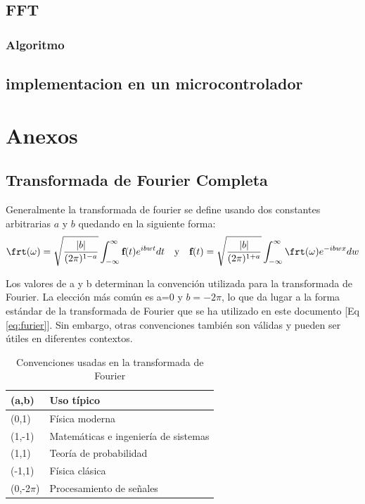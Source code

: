 \documentclass[12pt]{article}
\begin{document}
\subsection{FFT}
\subsubsection{Algoritmo}
\subsection{implementacion en un microcontrolador}
\newpage
\section{Anexos}
\appendix
\renewcommand{\thesubsection}{\Roman{subsection}}

\subsection{Transformada de Fourier Completa \label{sec:Fcompleta}}
Generalmente la transformada de fourier se define usando dos constantes arbitrarias $a$ y $b$ quedando en la siguiente forma:
\begin{equation}
\frt(\omega) = \sqrt{\dfrac{|b|}{(2\pi)^{1-a}}}\int_{-\infty}^{\infty} \textbf{f}(t) e^{ibw t} dt  \quad \text{y} \quad \textbf{f}(t) = \sqrt{\dfrac{|b|}{(2\pi)^{1+a}}}\int_{-\infty}^{\infty} \frt(\omega) e^{-ibw x} dw
\end{equation}

Los valores de a y b determinan la convención utilizada para la transformada de Fourier. La elección más común es a=0 y $b=-2\pi$, lo que da lugar a la forma estándar de la transformada de Fourier que se ha utilizado en este documento [Eq \ref{eq:furier}]. Sin embargo, otras convenciones también son válidas y pueden ser útiles en diferentes contextos. \cite{bracewell}

\begin{table}[!htb]
  \centering
  \caption{Convenciones usadas en la transformada de Fourier}
  \label{tab:convenciones-ft}
  \small
  \begin{tabular}{@{}l|l@{}}
    \toprule
    (a,b)      & Uso típico \\
    \midrule
    (0,1)      & Física moderna \\
    (1,-1)     & Matemáticas e ingeniería de sistemas \\
    (1,1)      & Teoría de probabilidad \\
    (-1,1)     & Física clásica \\
    (0,-2$\pi$)  & Procesamiento de señales \\
    \bottomrule
  \end{tabular}
\end{table}
\end{document}
